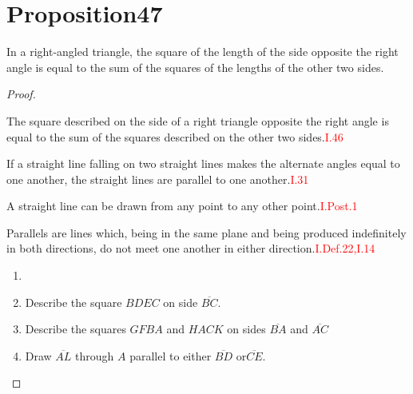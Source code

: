 
\section*{Proposition47}

\begin{thm}
In a right-angled triangle, the square of the length of the side opposite the right angle is equal to the sum of the squares of the lengths of the other two sides.
\end{thm}

\begin{proof}

\begin{lemma}
The square described on the side of a right triangle opposite the right angle is equal to the sum of the squares described on the other two sides.\hfill\textcolor{red}{I.46}
\end{lemma}
    
\begin{lemma}    
If a straight line falling on two straight lines makes the alternate angles equal to one another, the straight lines are parallel to one another.\hfill\textcolor{red}{I.31}
\end{lemma}    

\begin{lemma}
A straight line can be drawn from any point to any other point.\hfill\textcolor{red}{I.Post.1}
\end{lemma}    

\begin{lemma}
Parallels are lines which, being in the same plane and being produced indefinitely in both directions, do not meet one another in either direction.\hfill\textcolor{red}{I.Def.22,I.14}
\end{lemma}

\begin{con}
    \begin{enumerate}
    
    \item[]
    
        \item Describe the square $BDEC$ on side $\overline{BC}$.
        
        \item Describe the squares $GFBA$ and $HACK$ on sides $\overline{BA}$ and $\overline{AC}$
        
        \item Draw $\overline{AL}$ through $A$ parallel to either $\overline{BD}$ or$\overline{CE}$.
        

\end{enumerate}
\end{con}
\end{proof}
